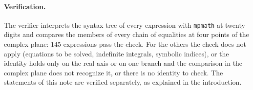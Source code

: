 \paragraph{Verification.}
The verifier interprets the syntax tree of every expression with
\texttt{mpmath} at twenty digits and compares the members of every chain of
equalities at four points of the complex plane: $145$ expressions pass the
check. For the others the check does not apply (equations to be solved,
indefinite integrals, symbolic indices), or the identity holds only on the
real axis or on one branch and the comparison in the complex plane does not
recognize it, or there is no identity to check. The statements of this note are verified separately, as explained
in the introduction.
